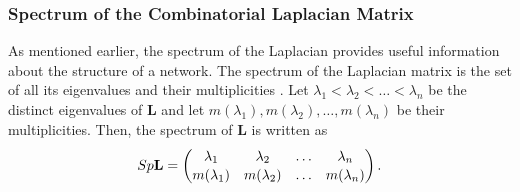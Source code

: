\documentclass[10pt,a4paper]{article}
\begin{document}
\subsubsection{Spectrum of the Combinatorial Laplacian Matrix}
As mentioned earlier, the spectrum of the Laplacian provides useful information about the structure of a network. The spectrum of the Laplacian matrix is the set of all its eigenvalues and their multiplicities \citep{estrada2011structure}. Let $\lambda_1 < \lambda_2 < \ldots < \lambda_n$ be the distinct eigenvalues of $\mathbf{L}$ and let $m(\lambda_1),m(\lambda_2), \ldots,m(\lambda_n)$ be their multiplicities. Then, the spectrum of $\mathbf{L}$ is written as
\begin{eqnarray}
Sp\mathbf{L} = 
\renewcommand*{\arraystretch}{1.1}
\begin{pmatrix*}
\lambda_1 & \lambda_2 & \ldots & \lambda_n \\
m(\lambda_1) & m(\lambda_2) & \ldots & m(\lambda_n)
\end{pmatrix*}.
\end{eqnarray}
\end{document}

